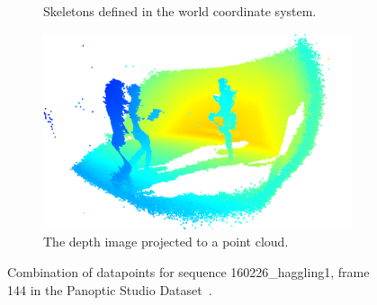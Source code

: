 \begin{figure}
\begin{subfigure}{.4\textwidth}
    \caption{Skeletons defined in the world coordinate system.}
    \label{fig:dataset_skeletons}
  \end{subfigure}%
  \newline
  \begin{subfigure}{.7\textwidth}
    \centering
    \includegraphics[width=\linewidth]{img/pointcloud}
    \caption{The depth image projected to a point cloud.}
    \label{fig:point_cloud}
  \end{subfigure}%
  \caption{Combination of datapoints for sequence 160226\_haggling1, frame 144 in the Panoptic Studio Dataset~\cite{Joo_2015_ICCV}.}
  \label{fig:skeleton_depth_duo}
\end{figure}

